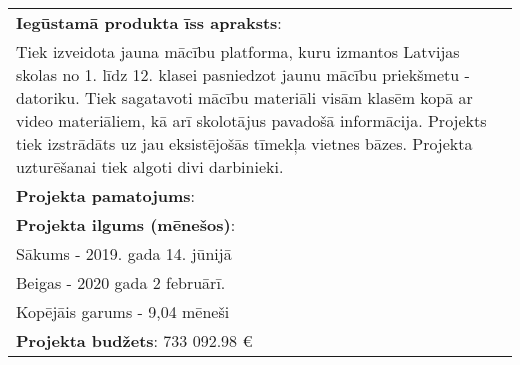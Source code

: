 \begin{table}[h!]
\begin{tabular}{|p{}|}
    \hline
      \textbf{Iegūstamā produkta īss apraksts}:\\
      Tiek izveidota jauna mācību platforma, kuru izmantos Latvijas skolas no 1. līdz 12. klasei
      pasniedzot jaunu mācību priekšmetu - datoriku. Tiek sagatavoti mācību materiāli visām klasēm kopā
      ar video materiāliem, kā arī skolotājus pavadošā informācija. Projekts tiek izstrādāts uz jau eksistējošās
      tīmekļa vietnes bāzes. Projekta uzturēšanai tiek algoti divi darbinieki.\\
    \hline
      \textbf{Projekta pamatojums}: \\
    \hline
      \textbf{Projekta ilgums (mēnešos)}: \\
        Sākums - 2019. gada 14. jūnijā \\
        Beigas - 2020 gada 2 februārī. \\
        Kopējāis garums - 9,04 mēneši \\
    \hline
      \textbf{Projekta budžets}: 733 092.98 €\\
    \hline
  \end{tabular}
\end{table}
\label{app:Projekta_priekslikums}


\clearpage